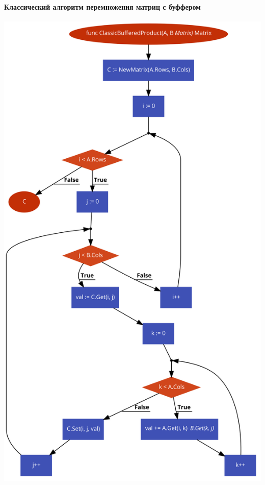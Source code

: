 \documentclass[utf8x, 12pt]{G7-32} %
\begin{document}
\newpage

\paragraph{Классический алгоритм перемножения матриц с буффером}
\begin{center}
	\includegraphics[scale=0.32]{images/matrixClassicBuffered.png}
\end{center}

\newpage
\end{document}
